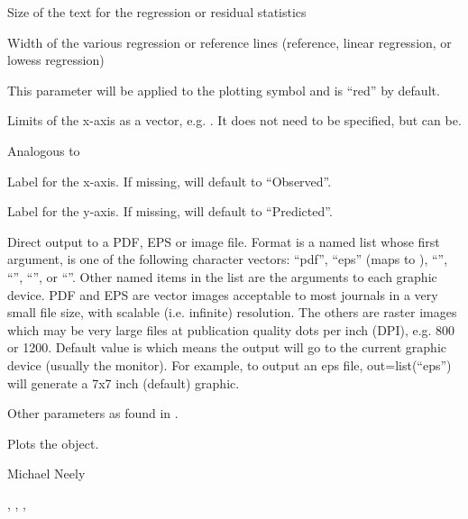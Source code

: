 \documentclass[a4paper]{book}
\begin{document}
\begin{Arguments}
\begin{ldescription}
\item[\code{cex.stat}] Size of the text for the regression or residual statistics

\item[\code{lwd}] Width of the various regression or reference lines (reference, linear regression, or
lowess regression)

\item[\code{col}] This parameter will be applied to the plotting symbol and is ``red'' by default.

\item[\code{xlim}] Limits of the x-axis as a vector, e.g. .  It does not need to be specified, but can be.

\item[\code{ylim}] Analogous to 

\item[\code{xlab}] Label for the x-axis.  If missing, will default to ``Observed''.

\item[\code{ylab}] Label for the y-axis.  If missing, will default to ``Predicted''.

\item[\code{out}] Direct output to a PDF, EPS or image file.  Format is a named list whose first argument, 
 is one of the following character vectors: ``pdf'', ``eps'' (maps to ),
``'', ``'', ``'', or ``''.  Other named items in the list
are the arguments to each graphic device. PDF and EPS are vector images acceptable to most journals
in a very small file size, with scalable (i.e. infinite) resolution.  The others are raster images which may be very
large files at publication quality dots per inch (DPI), e.g. 800 or 1200. Default value is  which means the 
output will go to the current graphic device (usually the monitor). For example, to output an eps file,
out=list(``eps'') will generate a 7x7 inch (default) graphic.

\item[\code{...}] Other parameters as found in .
\end{ldescription}
\end{Arguments}
%
\begin{Value}
Plots the object.
\end{Value}
%
\begin{Author}\relax
Michael Neely
\end{Author}
%
\begin{SeeAlso}\relax
{}, , , 
\end{SeeAlso}
\end{document}
